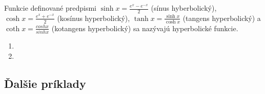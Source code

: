 Funkcie definované predpismi
$\sinh x=\frac{e^x-e^{-x}}{2}$ (sínus hyberbolický),
$\cosh x=\frac{e^x+e^{-x}}{2}$ (kosínus hyperbolický),
$\tanh x=\frac{\sinh x}{\cosh x}$ (tangens hyperbolický) a
$\coth x=\frac{cosh x}{sinh x}$ (kotangens hyperbolický) sa
nazývajú hyperbolické funkcie.

\begin{enumerate}[resume]
  \item {}
  \item {}
\end{enumerate}

\subsection{Ďalšie príklady}
